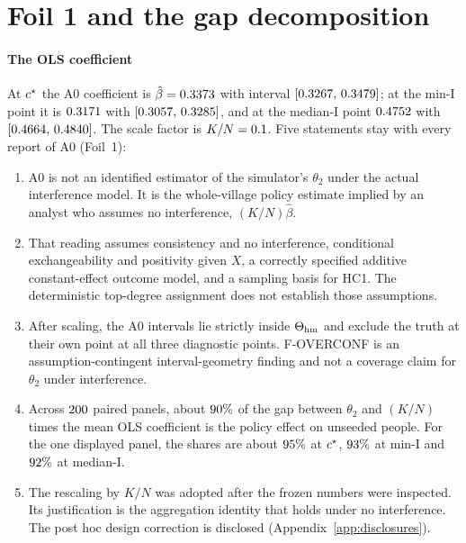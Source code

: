 \section{Foil 1 and the gap decomposition}\label{app:gap}

\paragraph{The OLS coefficient} At $c^\star$ the A0 coefficient is
$\hat\beta=0.3373$ with interval $[0.3267,\,0.3479]$; at the
min-I point it is $0.3171$ with $[0.3057,\,0.3285]$, and at the
median-I point $0.4752$ with $[0.4664,\,0.4840]$. The scale factor
is $K/N=0.1$. Five statements stay with every report of A0 (Foil~1):
\begin{enumerate}
  \item A0 is not an identified estimator of the simulator's $\theta_2$ under the
        actual interference model. It is the whole-village policy estimate implied
        by an analyst who assumes no interference, $(K/N)\hat\beta$.
  \item That reading assumes consistency and no interference, conditional
        exchangeability and positivity given $X$, a correctly specified additive
        constant-effect outcome model, and a sampling basis for HC1. The
        deterministic top-degree assignment does not establish those assumptions.
  \item After scaling, the A0 intervals lie strictly inside $\Theta_{\mathrm{hm}}$ and
        exclude the truth at their own point at all three diagnostic points.
        F-OVERCONF is an assumption-contingent interval-geometry finding and not a
        coverage claim for $\theta_2$ under interference.
  \item Across $200$ paired panels, about $90\%$
        of the gap between $\theta_2$ and $(K/N)$ times the mean OLS coefficient is
        the policy effect on unseeded people. For the one displayed panel, the
        shares are about $95\%$ at $c^\star$,
        $93\%$ at min-I and
        $92\%$ at median-I.
  \item The rescaling by $K/N$ was adopted after the frozen numbers were
        inspected. Its justification is the aggregation identity that holds under
        no interference. The post hoc design correction is disclosed
        (Appendix~\ref{app:disclosures}).
\end{enumerate}

